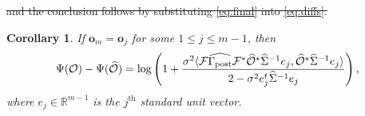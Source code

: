 \documentclass[ba]{imsart}
\newcommand{\obs}{\mathcal{O}}
\newcommand{\fwd}{\mathcal{F}}
\newcommand{\obsm}{\widehat{\obs}}
\newcommand{\Sigmam}{\widehat{\Sigma}}
\newcommand{\postcovm}{\widehat{\Gamma_{\textup{post}}}}
\newcommand{\tar}{\Psi}
\newcommand{\meas}{\mathbf{o}}
\theoremstyle{plain}
\newtheorem{corollary}[theorem]{Corollary}
\theoremstyle{definition}
\theoremstyle{remark}
\providecommand{\DIFdeltex}[1]{{\protect\color{red}\sout{#1}}}                      %
\providecommand{\DIFdelend}{} %
\providecommand{\DIFdel}[1]{\texorpdfstring{\DIFdeltex{#1}}{}} %
\DeclareRobustCommand{\DIFdelend}{\DIFOaddend \let\includegraphics\DIFOincludegraphics} %
\begin{document}
\DIFdel{and the conclusion follows by substituting \eqref{eq:final} into
  \eqref{eq:diffs}.
}%

\DIFdelend \begin{corollary}\label{cor:same_meas}
  If $\meas_m = \meas_j$ for some $1 \leq j \leq m-1$, then
  \begin{equation*}
    \tar(\obs) - \tar(\obsm) =
    \log \left ( 1 + \frac{\sigma^2
      \langle \fwd \postcovm \fwd^* \obsm^* \Sigmam^{-1} e_j,
      \obsm^* \Sigmam^{-1}e_j \rangle
    }{
      2 - \sigma^2 e_j^t\Sigmam^{-1}e_j 
    }       
    \right ),
  \end{equation*}
  where $e_j\in \mathbb{R}^{m-1}$ is the $j^{\text{th}}$ standard unit
  vector.
\end{corollary}
\end{document}
